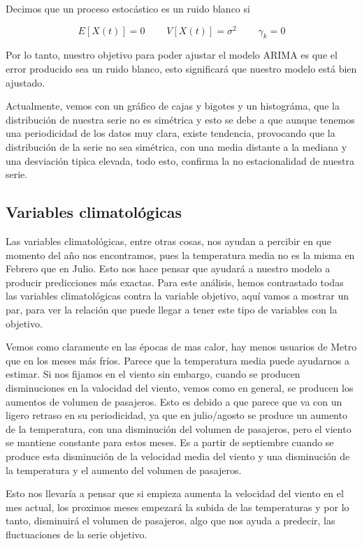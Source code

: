 \documentclass[11pt]{article}
\begin{document}
Decimos que un proceso estocástico es un ruido blanco si

\[ E[X(t)] = 0 \ \ \ \ \ \ \ \ \ \  V[X(t)]=\sigma^2  \ \ \ \ \ \ \ \ \ \ \gamma_k=0 \]

Por lo tanto, nuestro objetivo para poder ajustar el modelo ARIMA es que
el error producido sea un ruido blanco, esto significará que nuestro
modelo está bien ajustado.

Actualmente, vemos con un gráfico de cajas y bigotes y un histográma,
que la distribución de nuestra serie no es simétrica y esto se debe a
que aunque tenemos una periodicidad de los datos muy clara, existe
tendencia, provocando que la distribución de la serie no sea simétrica,
con una media distante a la mediana y una desviación tipìca elevada,
todo esto, confirma la no estacionalidad de nuestra serie.

    \hypertarget{variables-climatoluxf3gicas}{%
\subsection{Variables
climatológicas}\label{variables-climatoluxf3gicas}}

    Las variables climatológicas, entre otras cosas, nos ayudan a percibir
en que momento del año nos encontramos, pues la temperatura media no es
la misma en Febrero que en Julio. Esto nos hace pensar que ayudará a
nuestro modelo a producir predicciones más exactas. Para este análisis,
hemos contrastado todas las variables climatológicas contra la variable
objetivo, aquí vamos a mostrar un par, para ver la relación que puede
llegar a tener este tipo de variables con la objetivo.

    Vemos como claramente en las épocas de mas calor, hay menos usuarios de
Metro que en los meses más fríos. Parece que la temperatura media puede
ayudarnos a estimar. Si nos fijamos en el viento sin embargo, cuando se
producen disminuciones en la valocidad del viento, vemos como en
general, se producen los aumentos de volumen de pasajeros. Esto es
debido a que parece que va con un ligero retraso en su periodicidad, ya
que en julio/agosto se produce un aumento de la temperatura, con una
disminución del volumen de pasajeros, pero el viento se mantiene
constante para estos meses. Es a partir de septiembre cuando se produce
esta disminución de la velocidad media del viento y una disminución de
la temperatura y el aumento del volumen de pasajeros.

    Esto nos llevaría a pensar que si empieza aumenta la velocidad del
viento en el mes actual, los proximos meses empezará la subida de las
temperaturas y por lo tanto, disminuirá el volumen de pasajeros, algo
que nos ayuda a predecir, las fluctuaciones de la serie objetivo.
\end{document}

